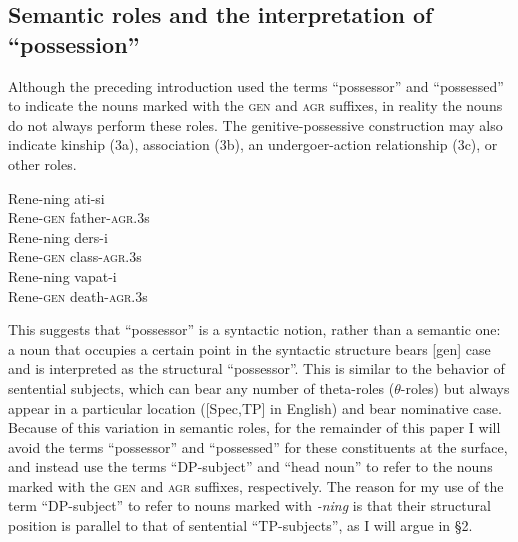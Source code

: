\documentclass[letterpaper,12pt]{article}
\newcommand{\poss}[2]{\textsc{agr}.{\footnotesize #1}#2}
\newcommand{\posst}{\textsc{agr}}
\newcommand{\gen}{\textsc{gen}}
\begin{document}
\subsection{Semantic roles and the interpretation of ``possession''}
Although the preceding introduction used the terms ``possessor'' and ``possessed'' to indicate the nouns marked with the \gen{} and \posst{} suffixes,
in reality the nouns do not always perform these roles. The genitive-possessive construction may also indicate kinship (3a), association (3b), an undergoer-action
relationship (3c), or other roles.
\begin{exe}
\ex
	\begin{xlist}
	\ex	\gll Rene-ning ati-si\\
					 Rene-\gen{}  father-\poss{3}{s}\\
	\ex \gll Rene-ning ders-i\\
				   Rene-\gen{} class-\poss{3}{s}\\
	\ex \gll Rene-ning vapat-i\\
					 Rene-\gen{}  death-\poss{3}{s}\\
	\end{xlist}
\end{exe}
This suggests that ``possessor'' is a syntactic notion, rather than a semantic one: a noun that occupies a certain point in the
syntactic structure bears [gen] case and is interpreted as the structural ``possessor''. This is similar to the behavior of sentential
subjects, which can bear any number of \mbox{theta-roles} \mbox{($\theta$-roles)} but always appear in a particular location ([Spec,TP] in English) and bear
nominative case. Because of this variation in semantic roles, for the remainder of this paper I will avoid the terms ``possessor'' and ``possessed'' for these constituents at the surface, and instead use the terms
``DP-subject'' and ``head noun'' to refer to the nouns marked with the \gen{} and \posst{} suffixes, respectively. The reason for my use of the term ``DP-subject'' to refer to nouns marked with \textsl{-ning} is that their structural position is parallel to that of sentential ``TP-subjects'', as I will argue in \S 2.
\end{document}
